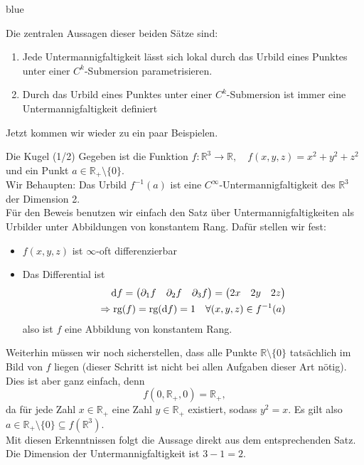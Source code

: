 blue{Die zentralen Aussagen dieser beiden Sätze sind:
\begin{enumerate}
    \item Jede Untermannigfaltigkeit lässt sich lokal durch das Urbild eines Punktes unter einer $C^k$-Submersion parametrisieren.
    \item Durch das Urbild eines Punktes unter einer $C^k$-Submersion ist immer eine Untermannigfaltigkeit definiert
\end{enumerate}
Jetzt kommen wir wieder zu ein paar Beispielen.}

\begin{Beispiel}
    {Die Kugel (1/2)}
    Gegeben ist die Funktion $f:\mathbb{R}^3\rightarrow\mathbb{R},\quad f(x,y,z)=x^2+y^2+z^2$ und ein Punkt $a\in\mathbb{R_+}\setminus\{0\}$. \\
    Wir Behaupten: Das Urbild $f^{-1}(a)$ ist eine $C^\infty$-Untermannigfaltigkeit des $\mathbb{R}^3$ der Dimension 2. \\
    Für den Beweis benutzen wir einfach den Satz über Untermannigfaltigkeiten als Urbilder unter Abbildungen von konstantem Rang. Dafür stellen wir fest:
    \begin{itemize}
        \item $f(x,y,z)$ ist $\infty$-oft differenzierbar
        \item Das Differential ist
        \begin{align*}
            \text{d}f=\begin{pmatrix}\partial_1 f & \partial_2 f & \partial_3 f\end{pmatrix} = \begin{pmatrix}2x & 2y & 2z\end{pmatrix} \\
            \Rightarrow \text{rg}(f)=\text{rg}(\text{d}f)=1 \quad \forall(x,y,z)\in f^{-1}(a)
        \end{align*}
        also ist $f$ eine Abbildung von konstantem Rang.
    \end{itemize}
    Weiterhin müssen wir noch sicherstellen, dass alle Punkte $\mathbb{R}\setminus\{0\}$ tatsächlich im Bild von $f$ liegen (dieser Schritt ist nicht bei allen Aufgaben dieser Art nötig). Dies ist aber ganz einfach, denn 
    \begin{equation*}
        f(0,\mathbb{R}_+,0)=\mathbb{R}_+,
    \end{equation*}
    da für jede Zahl $x\in\mathbb{R}_+$ eine Zahl $y\in\mathbb{R}_+$ existiert, sodass $y^2=x$. Es gilt also $a\in\mathbb{R_+}\setminus\{0\}\subseteq f(\mathbb{R}^3)$. \\
    Mit diesen Erkenntnissen folgt die Aussage direkt aus dem entsprechenden Satz. Die Dimension der Untermannigfaltigkeit ist $3-1=2$. \\
    

\end{Beispiel}
